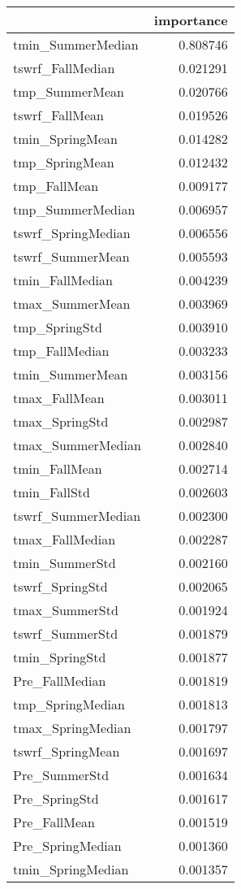 \begin{tabular}{lr}
\toprule
 & importance \\
\midrule
tmin_SummerMedian & 0.808746 \\
tswrf_FallMedian & 0.021291 \\
tmp_SummerMean & 0.020766 \\
tswrf_FallMean & 0.019526 \\
tmin_SpringMean & 0.014282 \\
tmp_SpringMean & 0.012432 \\
tmp_FallMean & 0.009177 \\
tmp_SummerMedian & 0.006957 \\
tswrf_SpringMedian & 0.006556 \\
tswrf_SummerMean & 0.005593 \\
tmin_FallMedian & 0.004239 \\
tmax_SummerMean & 0.003969 \\
tmp_SpringStd & 0.003910 \\
tmp_FallMedian & 0.003233 \\
tmin_SummerMean & 0.003156 \\
tmax_FallMean & 0.003011 \\
tmax_SpringStd & 0.002987 \\
tmax_SummerMedian & 0.002840 \\
tmin_FallMean & 0.002714 \\
tmin_FallStd & 0.002603 \\
tswrf_SummerMedian & 0.002300 \\
tmax_FallMedian & 0.002287 \\
tmin_SummerStd & 0.002160 \\
tswrf_SpringStd & 0.002065 \\
tmax_SummerStd & 0.001924 \\
tswrf_SummerStd & 0.001879 \\
tmin_SpringStd & 0.001877 \\
Pre_FallMedian & 0.001819 \\
tmp_SpringMedian & 0.001813 \\
tmax_SpringMedian & 0.001797 \\
tswrf_SpringMean & 0.001697 \\
Pre_SummerStd & 0.001634 \\
Pre_SpringStd & 0.001617 \\
Pre_FallMean & 0.001519 \\
Pre_SpringMedian & 0.001360 \\
tmin_SpringMedian & 0.001357 \\

\end{tabular}
